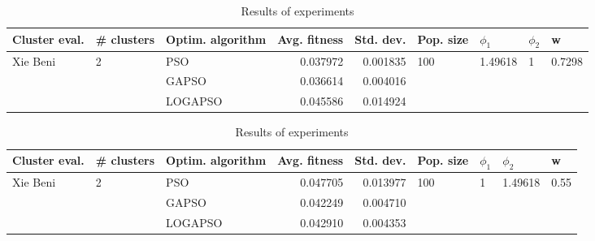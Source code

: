 \documentclass{article}
\begin{document}
\begin{table}
\centering
\caption{Results of experiments}
\begin{tabular}{lllrrllll}
\toprule
            Cluster eval. &        \# clusters & Optim. algorithm &  Avg. fitness &  Std. dev. &            Pop. size &               $\phi_{1}$ &         $\phi_{2}$ &                       w \\
\midrule
\multirow{3}{*}{Xie Beni} & \multirow{3}{*}{2} &              PSO &      0.037972 &   0.001835 & \multirow{3}{*}{100} & \multirow{3}{*}{1.49618} & \multirow{3}{*}{1} & \multirow{3}{*}{0.7298} \\
                          &                    &            GAPSO &      0.036614 &   0.004016 &                      &                          &                    &                         \\
                          &                    &          LOGAPSO &      0.045586 &   0.014924 &                      &                          &                    &                         \\
\bottomrule
\end{tabular}
\end{table}
\begin{table}
\centering
\caption{Results of experiments}
\begin{tabular}{lllrrllll}
\toprule
            Cluster eval. &        \# clusters & Optim. algorithm &  Avg. fitness &  Std. dev. &            Pop. size &         $\phi_{1}$ &               $\phi_{2}$ &                     w \\
\midrule
\multirow{3}{*}{Xie Beni} & \multirow{3}{*}{2} &              PSO &      0.047705 &   0.013977 & \multirow{3}{*}{100} & \multirow{3}{*}{1} & \multirow{3}{*}{1.49618} & \multirow{3}{*}{0.55} \\
                          &                    &            GAPSO &      0.042249 &   0.004710 &                      &                    &                          &                       \\
                          &                    &          LOGAPSO &      0.042910 &   0.004353 &                      &                    &                          &                       \\
\bottomrule
\end{tabular}
\end{table}
\end{document}
